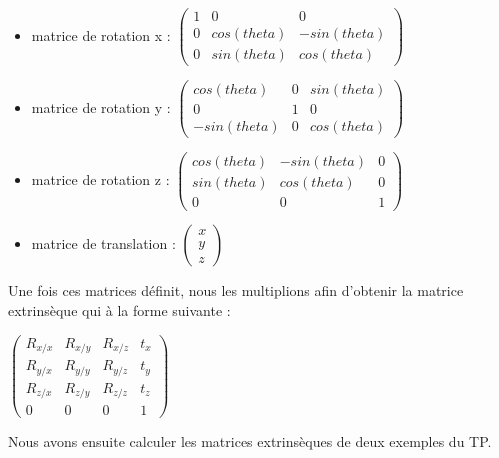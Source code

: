 \documentclass[a4paper,11pt]{article}
\begin{document}
  \begin{itemize}
   \item matrice de rotation x : 
   $\begin{pmatrix}
     1 & 0 & 0\\
     0 & cos(theta) & -sin(theta)\\
     0 & sin(theta) & cos(theta)
    \end{pmatrix}$
    
   \item matrice de rotation y : 
   $\begin{pmatrix}
     cos(theta) & 0 & sin(theta)\\
     0 & 1 & 0\\
     -sin(theta) & 0 & cos(theta)
    \end{pmatrix}$
    
   \item matrice de rotation z : 
   $\begin{pmatrix}
     cos(theta) & -sin(theta) & 0\\
     sin(theta) & cos(theta) & 0\\
     0 & 0 & 1
    \end{pmatrix}$
    
   \item matrice de translation : 
   $\begin{pmatrix}
     x\\
     y\\
     z
    \end{pmatrix}$

  \end{itemize}
  
  Une fois ces matrices définit, nous les multiplions afin d'obtenir la matrice
  extrinsèque qui à la forme suivante :\\
  \begin{center}
    $\begin{pmatrix}
      R_{x/x} & R_{x/y} & R_{x/z} & t_{x}\\
      R_{y/x} & R_{y/y} & R_{y/z} & t_{y}\\
      R_{z/x} & R_{z/y} & R_{z/z} & t_{z}\\
      0 & 0 & 0 & 1
      \end{pmatrix}$
  \end{center}

  
  Nous avons ensuite calculer les matrices extrinsèques de deux exemples du TP.\\
  
\end{document}

